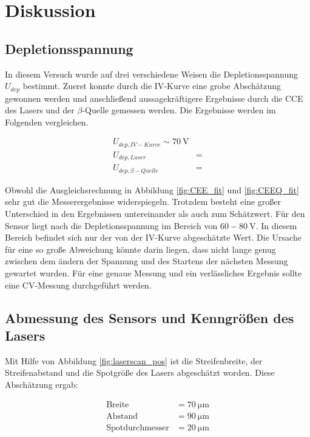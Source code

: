 \section{Diskussion}
\label{sec:Diskussion}

\subsection{Depletionsspannung}
In diesem Versuch wurde auf drei verschiedene Weisen die Depletionsspannung $U_{dep}$ bestimmt. Zuerst konnte durch die IV-Kurve eine grobe Abschätzung gewonnen werden und anschließend aussagekräftigere Ergebnisse durch die CCE des Lasers und der $\beta$-Quelle gemessen werden. Die Ergebnisse werden im Folgenden vergleichen.
 
\begin{align}
	U_{dep, IV-Kurve} \sim \SI{70}{\volt}\\
	U_{dep, Laser} &= \\
	U_{dep, \beta -Quelle} &= 
\end{align} 

Obwohl die Ausgleichsrechnung in Abbildung \ref{fig:CEE_fit} und \ref{fig:CEEQ_fit} sehr gut die Messerergebnisse widerspiegeln. Trotzdem besteht eine großer Unterschied in den Ergebnissen untereinander als auch zum Schätzwert. Für den Sensor liegt nach \cite{skript} die Depletionsspannung im Bereich von $60-\SI{80}{\volt}$. In diesem Bereich befindet sich nur der von der IV-Kurve abgeschätzte Wert. Die Ursache für eine so große Abweichung könnte darin liegen, dass nicht lange genug zwischen dem ändern der Spannung und des Startens der nächsten Messung gewartet wurden. Für eine genaue Messung und ein verlässliches Ergebnis sollte eine CV-Messung durchgeführt werden.

\subsection{Abmessung des Sensors und Kenngrößen des Lasers}
Mit Hilfe von Abbildung \ref{fig:laserscan_pos} ist die Streifenbreite, der Streifenabstand und die Spotgröße des Lasers abgeschätzt worden. Diese Abschätzung ergab:

\begin{align}
	\text{Breite} &= \SI{70}{\micro\meter}\\
	\text{Abstand} &= \SI{90}{\micro\meter}\\
	\text{Spotdurchmesser} &= \SI{20}{\micro\meter}
\end{align} 

